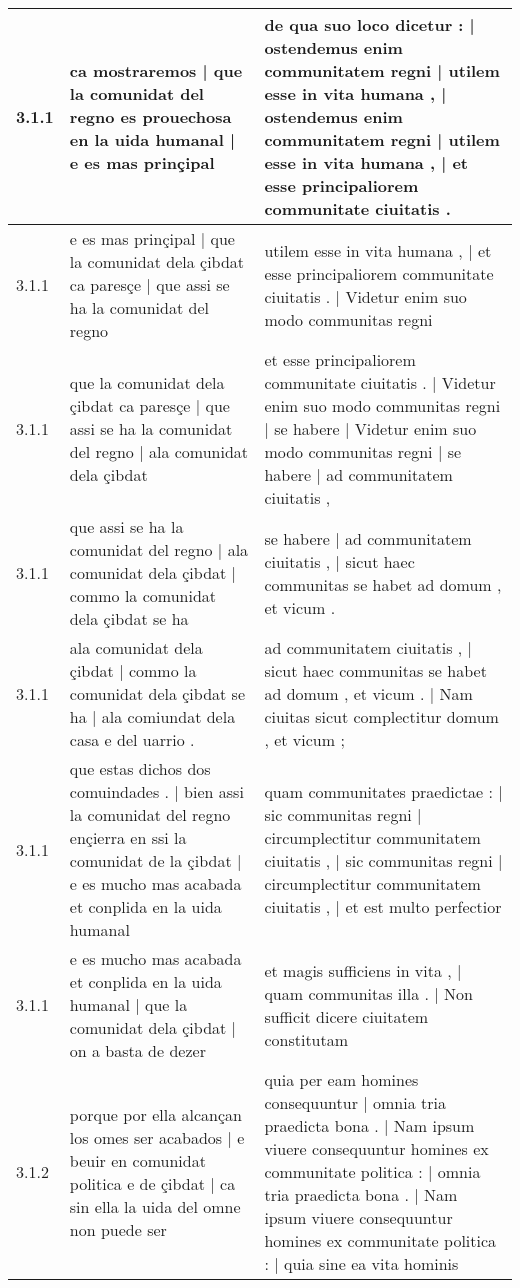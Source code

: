 \begin{tabular}{|p{1cm}|p{6.5cm}|p{6.5cm}|}
3.1.1 & ca mostraremos | que la comunidat del regno es prouechosa en la uida humanal | e es mas prinçipal & de qua suo loco dicetur : | ostendemus enim communitatem regni | utilem esse in vita humana , | ostendemus enim communitatem regni | utilem esse in vita humana , | et esse principaliorem communitate ciuitatis . \\\hline
3.1.1 & e es mas prinçipal | que la comunidat dela çibdat ca paresçe | que assi se ha la comunidat del regno & utilem esse in vita humana , | et esse principaliorem communitate ciuitatis . | Videtur enim suo modo communitas regni \\\hline
3.1.1 & que la comunidat dela çibdat ca paresçe | que assi se ha la comunidat del regno | ala comunidat dela çibdat & et esse principaliorem communitate ciuitatis . | Videtur enim suo modo communitas regni | se habere | Videtur enim suo modo communitas regni | se habere | ad communitatem ciuitatis , \\\hline
3.1.1 & que assi se ha la comunidat del regno | ala comunidat dela çibdat | commo la comunidat dela çibdat se ha & se habere | ad communitatem ciuitatis , | sicut haec communitas se habet ad domum , et vicum . \\\hline
3.1.1 & ala comunidat dela çibdat | commo la comunidat dela çibdat se ha | ala comiundat dela casa e del uarrio . & ad communitatem ciuitatis , | sicut haec communitas se habet ad domum , et vicum . | Nam ciuitas sicut complectitur domum , et vicum ; \\\hline
3.1.1 & que estas dichos dos comuindades . | bien assi la comunidat del regno ençierra en ssi la comunidat de la çibdat | e es mucho mas acabada et conplida en la uida humanal & quam communitates praedictae : | sic communitas regni | circumplectitur communitatem ciuitatis , | sic communitas regni | circumplectitur communitatem ciuitatis , | et est multo perfectior \\\hline
3.1.1 & e es mucho mas acabada et conplida en la uida humanal | que la comunidat dela çibdat | on a basta de dezer & et magis sufficiens in vita , | quam communitas illa . | Non sufficit dicere ciuitatem constitutam \\\hline
3.1.2 & porque por ella alcançan los omes ser acabados | e beuir en comunidat politica e de çibdat | ca sin ella la uida del omne non puede ser & quia per eam homines consequuntur | omnia tria praedicta bona . | Nam ipsum viuere consequuntur homines ex communitate politica : | omnia tria praedicta bona . | Nam ipsum viuere consequuntur homines ex communitate politica : | quia sine ea vita hominis \\\hline

\end{tabular}
